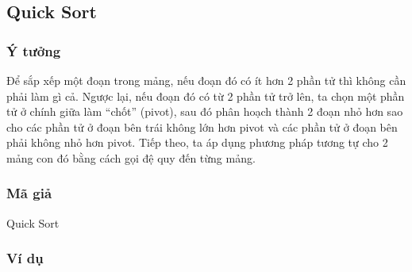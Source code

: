 \subsection{Quick Sort}

\subsubsection{Ý tưởng}

Để sắp xếp một đoạn trong mảng, nếu đoạn đó có ít hơn 2 phần tử thì không cần phải làm gì cả. Ngược lại, nếu đoạn đó có từ 2 phần tử trở lên, ta chọn một phần tử ở chính giữa làm “chốt” (pivot), sau đó phân hoạch thành 2 đoạn nhỏ hơn sao cho các phần tử ở đoạn bên trái không lớn hơn pivot và các phần tử ở đoạn bên phải không nhỏ hơn pivot. Tiếp theo, ta áp dụng phương pháp tương tự cho 2 mảng con đó bằng cách gọi đệ quy đến từng mảng. \cite[p.~93--94]{hoang2008}

\subsubsection{Mã giả}

\begin{algorithm}[H]
	\caption{Quick Sort \cite{code-quick}}
	\label{quick-sort}

\end{algorithm}

\subsubsection{Ví dụ}

